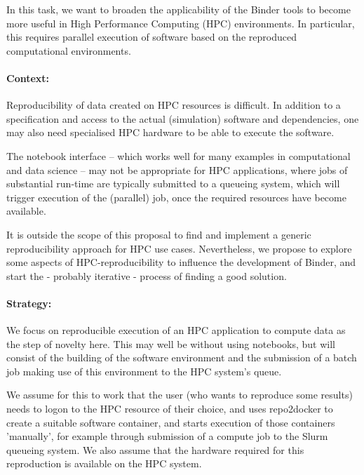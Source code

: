 \begin{task}[
  title=Binder at HPC facilities,
  id=binder-at-hpc,
  lead=MP,
  PM=17,
  partners={IFR,UIO}
]
In this task, we want to broaden the applicability of the Binder tools to become
more useful in High Performance Computing (HPC) environments. In particular, this
requires parallel execution of software based on the reproduced computational environments.

\paragraph*{Context:}
Reproducibility of data created on HPC resources is difficult. In addition to
a specification and access to the actual (simulation) software and dependencies,
one may also need specialised HPC hardware to be able to execute the software.

The notebook interface -- which works well for many examples in computational and
data science -- may not be appropriate for HPC applications, where jobs of
substantial run-time are typically submitted to a queueing system, which will
trigger execution of the (parallel) job, once the required resources have become
available.

It is outside the scope of this proposal to find and implement a generic
reproducibility approach for HPC use cases. Nevertheless, we propose to explore
some aspects of HPC-reproducibility to influence the development of Binder,
and start the - probably iterative - process of finding a good solution.

\paragraph*{Strategy:}
We focus on reproducible execution of an HPC application to compute data as the step of
novelty here. This may well be without using notebooks, but will consist of the
building of the software environment and the submission of a batch job making use of this
environment to the HPC system's queue.

We assume for this to work that the user (who wants to reproduce some results)
needs to logon to the HPC resource of their choice, and uses repo2docker to
create a suitable software container, and starts execution of those containers
'manually', for example through submission of a compute job to the Slurm
queueing system. We also assume that the hardware required for this reproduction
is available on the HPC system.


\end{task}
